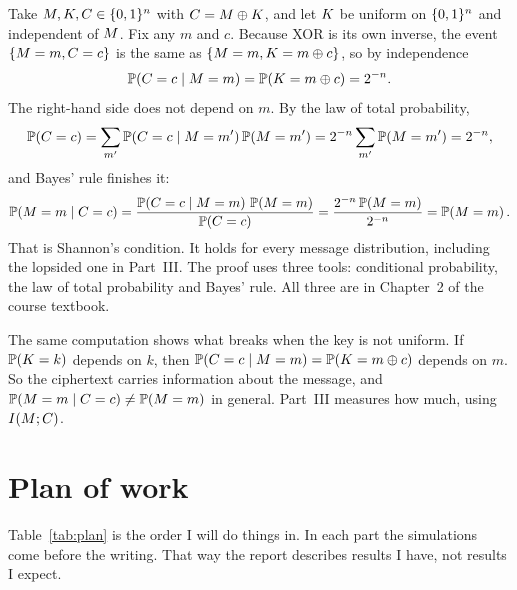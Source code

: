 Take $M, K, C \in \{0,1\}^n$ with $C = M \oplus K$, and let
$K$ be uniform on $\{0,1\}^n$ and independent of $M$. Fix any $m$ and $c$.
Because XOR is its own inverse, the event $\{M = m, C = c\}$ is the
same as $\{M = m, K = m \oplus c\}$, so by independence
\[
  \mathbb{P}\!\left(C = c \mid M = m\right) = \mathbb{P}\!\left(K = m \oplus c\right) = 2^{-n}.
\]
The right-hand side does not depend on $m$. By the law of total probability,
\[
  \mathbb{P}\!\left(C = c\right) = \sum_{m'} \mathbb{P}\!\left(C = c \mid M = m'\right)\mathbb{P}\!\left(M = m'\right)
                   = 2^{-n} \sum_{m'} \mathbb{P}\!\left(M = m'\right) = 2^{-n},
\]
and Bayes' rule finishes it:
\[
  \mathbb{P}\!\left(M = m \mid C = c\right)
    = \frac{\mathbb{P}\!\left(C = c \mid M = m\right)\,\mathbb{P}\!\left(M = m\right)}{\mathbb{P}\!\left(C = c\right)}
    = \frac{2^{-n}\,\mathbb{P}\!\left(M = m\right)}{2^{-n}} = \mathbb{P}\!\left(M = m\right).
\]
That is Shannon's condition.  It holds for every message distribution,
including the lopsided one in Part~III.  The proof uses three tools:
conditional probability, the law of total probability and Bayes' rule.
All three are in Chapter~2 of the course textbook.

The same computation shows what breaks when the key is not uniform.  If
$\mathbb{P}\!\left(K = k\right)$ depends on $k$, then
$\mathbb{P}\!\left(C = c \mid M = m\right) = \mathbb{P}\!\left(K = m \oplus c\right)$ depends on $m$.
So the ciphertext carries information about the message, and
$\mathbb{P}\!\left(M = m \mid C = c\right) \neq \mathbb{P}\!\left(M = m\right)$ in general.
Part~III measures how much, using $I\!\left(M ; C\right)$.

\section{Plan of work}\label{sec:plan}

Table~\ref{tab:plan} is the order I will do things in.  In each part the
simulations come before the writing.  That way the report describes
results I have, not results I expect.

